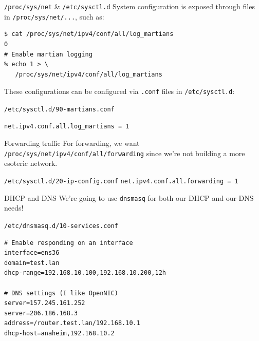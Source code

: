 \documentclass[bigger,aspectratio=169]{beamer}
\begin{document}
\begin{frame}[fragile,label={sec:org6f2d154}]{\texttt{/proc/sys/net} \& \texttt{/etc/sysctl.d}}
  System configuration is exposed through files in \texttt{/proc/sys/net/...}, such as:
\begin{verbatim}
$ cat /proc/sys/net/ipv4/conf/all/log_martians
0
# Enable martian logging
% echo 1 > \
   /proc/sys/net/ipv4/conf/all/log_martians
\end{verbatim}
  \vfill
  These configurations can be configured via \texttt{.conf} files in \texttt{/etc/sysctl.d}:
  \begin{block}{\texttt{/etc/sysctl.d/90-martians.conf}}
\begin{verbatim}
net.ipv4.conf.all.log_martians = 1
\end{verbatim}
  \end{block}
\end{frame}

\begin{frame}{Forwarding traffic}
  For forwarding, we want \texttt{/proc/sys/net/ipv4/conf/all/forwarding} since we're not building a more esoteric network.
  \vfill
\begin{block}{\texttt{/etc/sysctl.d/20-ip-config.conf}}
  \texttt{net.ipv4.conf.all.forwarding = 1}
\end{block}
\end{frame}

\begin{frame}[fragile]{DHCP and DNS}
  We're going to use \texttt{dnsmasq} for both our DHCP and our DNS needs!
  \begin{block}{\texttt{/etc/dnsmasq.d/10-services.conf}}
\begin{verbatim}
# Enable responding on an interface
interface=ens36
domain=test.lan
dhcp-range=192.168.10.100,192.168.10.200,12h

# DNS settings (I like OpenNIC)
server=157.245.161.252
server=206.186.168.3
address=/router.test.lan/192.168.10.1
dhcp-host=anaheim,192.168.10.2
\end{verbatim}
  \end{block}
\end{frame}
\end{document}
